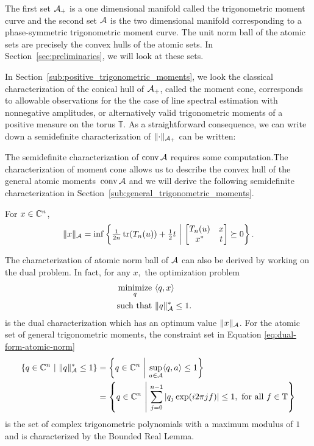 The first set $\mathcal{A}_+$ is a one dimensional manifold called the trigonometric
moment curve and the second set $\mathcal{A}$ is the two dimensional manifold
corresponding to a phase-symmetric trigonometric moment curve. The unit norm
ball of the atomic sets are precisely the convex hulls of the atomic sets. In 
Section~\ref{sec:preliminaries}, we will look at these sets.

In Section~\ref{sub:positive_trigonometric_moments}, we look the classical
characterization of the conical hull of $\mathcal{A}_+$, called the moment cone,
corresponds to allowable observations for the the case of line spectral
estimation with nonnegative amplitudes, or alternatively valid trigonometric
moments of a positive measure on the torus $\mathbb{T}$. As a straightforward
consequence, we can write down a semidefinite characterization of
$\lVert\cdot\rVert_{\mathcal{A}_+}$ can be written: 

The semidefinite characterization of $\operatorname{conv}{\mathcal{A}}$ requires some computation.The
characterization of moment cone allows us to describe the convex hull of the
general atomic moments~$\operatorname{conv}{\mathcal{A}}$ and we will derive the following semidefinite
characterization in Section~\ref{sub:general_trigonometric_moments}.

\begin{theorem}\label{thm:sdp-char}
	For $x\in \mathbb{C}^n$,
	\begin{equation}
	\label{eq:atomic_sdp}
	\|x\|_{\mathcal{A}} = \inf\left\{ \tfrac{1}{2n} \operatorname{tr}( T_n(u)) +\tfrac{1}{2} t ~\middle|~ \begin{bmatrix}
T_n(u) & x\\
x^* & t
\end{bmatrix} \succeq 0 \right\}.
	\end{equation}
\end{theorem}

The characterization of atomic norm ball of $\mathcal{A}$ can also be derived by working on the dual problem. In fact, for any $x,$ the optimization problem
\begin{equation}
	\label{eq:dual-form-atomic-norm}
	\begin{aligned}
		\mathop{\operatorname{minimize}}_q~ & \langle q, x\rangle &&\\
		\text{such that } & \lVert q\rVert_{\mathcal{A}}^*	 \leq 1.	&&
	\end{aligned}
\end{equation}
is the dual characterization which has an optimum value $\lVert x\rVert_{\mathcal{A}}$. For the atomic set of general trigonometric moments, the constraint set in Equation \eqref{eq:dual-form-atomic-norm}
\begin{align}
	\left\{ q \in \mathbb{C}^n ~\middle|~ \lVert q\rVert_{\mathcal{A}}^* \leq 1 \right\} &
	= \left\{ q \in \mathbb{C}^n ~\middle|~ \sup_{a \in \mathcal{A}}\langle q, a\rangle \leq 1 \right\} \\
	&= \left\{ q \in \mathbb{C}^n ~\middle|~ \sum_{j=0}^{n-1}{|q_j \exp(i 2\pi j f)|} \leq 1, \text{ for all } f \in \mathbb{T} \right\}
\end{align}
is the set of complex trigonometric polynomials with a maximum modulus of $1$
and is characterized by the Bounded Real Lemma. 

